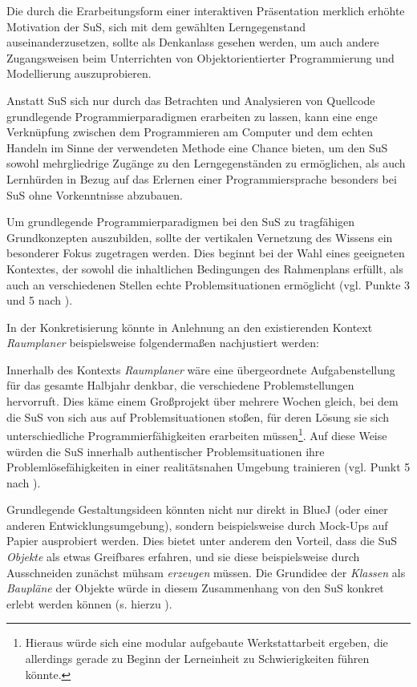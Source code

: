 \documentclass[paper=a4, DIV=13, BCOR=8mm, oneside=on, onecolumn=on, open = any, titlepage =on, parskip =half-, headsepline = on, footsepline = off, chapterprefix = on, sectionprefix = on, appendixprefix = off, fontsize = 12pt, numbers = noenddot, abstract = off]{scrreprt}
\begin{document}
Die durch die Erarbeitungsform einer interaktiven Präsentation merklich erhöhte Motivation der SuS, sich mit dem gewählten Lerngegenstand auseinanderzusetzen, sollte als Denkanlass gesehen werden, um auch andere Zugangsweisen beim Unterrichten von Objektorientierter Programmierung und Modellierung auszuprobieren.

Anstatt SuS sich nur durch das Betrachten und Analysieren von Quellcode grundlegende Programmierparadigmen erarbeiten zu lassen, kann eine enge Verknüpfung zwischen dem Programmieren am Computer und dem echten Handeln im Sinne der verwendeten Methode eine Chance bieten, um den SuS sowohl mehrgliedrige Zugänge zu den Lerngegenständen zu ermöglichen, als auch Lernhürden in Bezug auf das Erlernen einer Programmiersprache besonders bei SuS ohne Vorkenntnisse abzubauen.

Um grundlegende Programmierparadigmen bei den SuS zu tragfähigen Grundkonzepten auszubilden, sollte der vertikalen Vernetzung des Wissens ein besonderer Fokus zugetragen werden. Dies beginnt bei der Wahl eines geeigneten Kontextes, der sowohl die inhaltlichen Bedingungen des Rahmenplans erfüllt, als auch an verschiedenen Stellen echte Problemsituationen ermöglicht (vgl. Punkte 3 und 5 nach \cite[S.67]{hubwieser:07}). 


In der Konkretisierung könnte in Anlehnung an den existierenden Kontext \textit{Raumplaner} beispielsweise folgendermaßen nachjustiert werden:

Innerhalb des Kontexts \emph{Raumplaner} wäre eine übergeordnete Aufgabenstellung für das gesamte Halbjahr denkbar, die verschiedene Problemstellungen hervorruft. Dies käme einem Großprojekt über mehrere Wochen gleich, bei dem die SuS von sich aus auf Problemsituationen stoßen, für deren Lösung sie sich unterschiedliche Programmierfähigkeiten erarbeiten müssen\footnote{Hieraus würde sich eine modular aufgebaute Werkstattarbeit ergeben, die allerdings gerade zu Beginn der Lerneinheit zu Schwierigkeiten führen könnte.}. Auf diese Weise würden die SuS innerhalb authentischer Problemsituationen ihre Problemlösefähigkeiten in einer realitätsnahen Umgebung trainieren (vgl. Punkt 5 nach \cite[S.67]{hubwieser:07}).

Grundlegende Gestaltungsideen könnten nicht nur direkt in BlueJ (oder einer anderen Entwicklungsumgebung), sondern beispielsweise durch Mock-Ups auf Papier ausprobiert werden. Dies bietet unter anderem den Vorteil, dass die SuS \emph{Objekte} als etwas Greifbares erfahren, und sie diese beispielsweise durch Ausschneiden zunächst mühsam \emph{erzeugen} müssen. Die Grundidee der \emph{Klassen} als \emph{Baupläne} der Objekte würde in diesem Zusammenhang von den SuS konkret erlebt werden können (s. hierzu \cite[S.109]{aebli:11}).
\end{document}
